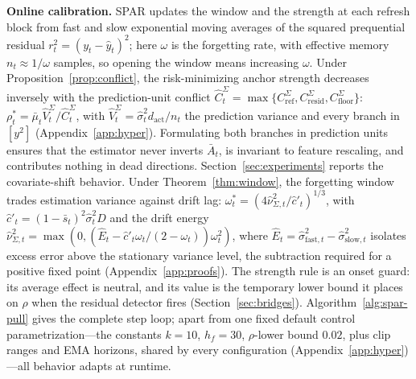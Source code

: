 \documentclass[10pt]{article}
\begin{document}
\textbf{Online calibration.}
SPAR updates the window and the strength at each refresh block from fast and slow exponential moving averages of the squared prequential residual $r_t^2 = (y_t - \hat y_t)^2$; here $\omega$ is the forgetting rate, with effective memory $n_t \approx 1/\omega$ samples, so opening the window means increasing $\omega$.
Under Proposition~\ref{prop:conflict}, the risk-minimizing anchor strength decreases inversely with the prediction-unit conflict $\widehat C^\Sigma_t = \max\{C^\Sigma_{\mathrm{ref}}, C^\Sigma_{\mathrm{resid}}, C^\Sigma_{\mathrm{floor}}\}$: $\rho^*_t = \bar\mu_t \widehat V^\Sigma_t/\widehat C^\Sigma_t$, with $\widehat V^\Sigma_t = \hat\sigma^2_t d_{\mathrm{act}}/n_t$ the prediction variance and every branch in $[y^2]$ (Appendix~\ref{app:hyper}).
Formulating both branches in prediction units ensures that the estimator never inverts $\bar A_t$, is invariant to feature rescaling, and contributes nothing in dead directions. Section~\ref{sec:experiments} reports the covariate-shift behavior.
Under Theorem~\ref{thm:window}, the forgetting window trades estimation variance against drift lag: $\omega^*_t = (4\widehat\nu^2_{\Sigma,t} / \hat c'_t)^{1/3}$, with $\hat c'_t = (1-\bar s_t)^2 \hat\sigma^2_t D$ and the drift energy $\widehat\nu^2_{\Sigma,t} = \max(0, (\widehat E_t - \hat c'_t \omega_t/(2-\omega_t))\omega_t^2)$, where $\widehat E_t = \hat\sigma^2_{\mathrm{fast},t} - \hat\sigma^2_{\mathrm{slow},t}$ isolates excess error above the stationary variance level, the subtraction required for a positive fixed point (Appendix~\ref{app:proofs}).
The strength rule is an onset guard: its average effect is neutral, and its value is the temporary lower bound it places on $\rho$ when the residual detector fires (Section~\ref{sec:bridges}).
Algorithm~\ref{alg:spar-pull} gives the complete step loop; apart from one fixed default control parametrization---the constants $k{=}10$, $h_f{=}30$, $\rho$-lower bound $0.02$, plus clip ranges and EMA horizons, shared by every configuration (Appendix~\ref{app:hyper})---all behavior adapts at runtime.
\end{document}
